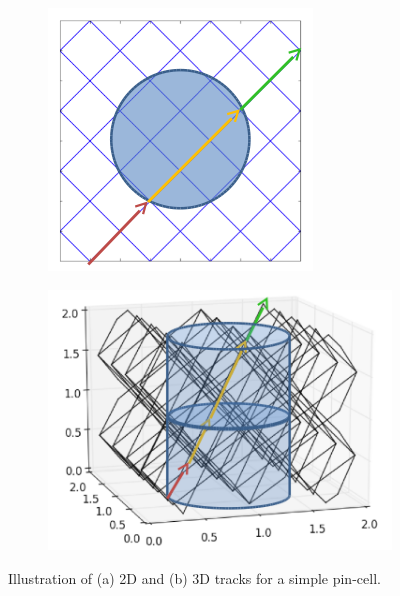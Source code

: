 \begin{figure}[h!]
	\centering
	\begin{subfigure}{0.25\textwidth}
		\centering
		\includegraphics[width=\linewidth]{figures/laydown/defense-sample-tracks_a.png}
		\caption{}
		\label{fig:sample-tracks-a}
	\end{subfigure}
	\begin{subfigure}{0.35\textwidth}
		\centering
		\includegraphics[width=\linewidth]{figures/laydown/defense-sample-tracks_b.png}
		\caption{}
		\label{fig:sample-tracks-b}
	\end{subfigure}
	\caption[]{Illustration of (a) 2D and (b) 3D  tracks for a simple pin-cell.}
	\label{fig:sample-tracks}
\end{figure}


